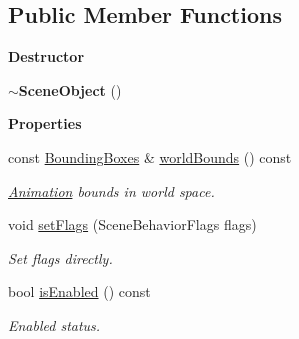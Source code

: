 \subsection*{Public Member Functions}
\begin{Indent}\textbf{ Destructor}\par
\begin{DoxyCompactItemize}
\item 
\mbox{\label{classrev_1_1_scene_object_af982242ee7618e4fb2506c6a153f5478}} 
{\bfseries $\sim$\+Scene\+Object} ()
\end{DoxyCompactItemize}
\end{Indent}
\begin{Indent}\textbf{ Properties}\par
\begin{DoxyCompactItemize}
\item 
const \mbox{\hyperlink{classrev_1_1_bounding_geometry}{Bounding\+Boxes}} \& \mbox{\hyperlink{classrev_1_1_scene_object_a21b3f3119f7228a78bfe077c6e57a0b8}{world\+Bounds}} () const
\begin{DoxyCompactList}\small\item\em \mbox{\hyperlink{classrev_1_1_animation}{Animation}} bounds in world space. \end{DoxyCompactList}\item 
\mbox{\label{classrev_1_1_scene_object_af1860ad96d9f2077d4094ba699209cdb}} 
void \mbox{\hyperlink{classrev_1_1_scene_object_af1860ad96d9f2077d4094ba699209cdb}{set\+Flags}} (Scene\+Behavior\+Flags flags)
\begin{DoxyCompactList}\small\item\em Set flags directly. \end{DoxyCompactList}\item 
\mbox{\label{classrev_1_1_scene_object_aa251b11b68987fe4a7596891e3553060}} 
bool \mbox{\hyperlink{classrev_1_1_scene_object_aa251b11b68987fe4a7596891e3553060}{is\+Enabled}} () const
\begin{DoxyCompactList}\small\item\em Enabled status. \end{DoxyCompactList}\item 
\mbox{\label{classrev_1_1_scene_object_ad5ef55b42f4c4cc667c4cd59ee3e7449}} 

\end{DoxyCompactItemize}
\end{Indent}
